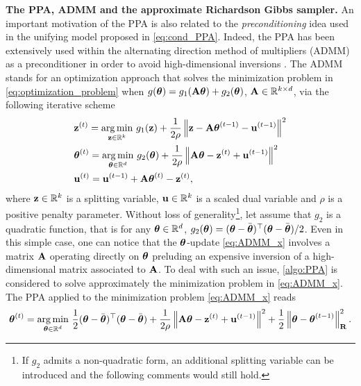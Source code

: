 \documentclass[nohypdvips,onefignum,onetabnum]{siamart171218}
\begin{document}
\noindent\textbf{The PPA, ADMM and the approximate Richardson Gibbs sampler.} An important motivation of the PPA is also related to the {\em preconditioning} idea used in the unifying model proposed in \cref{eq:cond_PPA}.
Indeed, the PPA has been extensively used within the alternating direction method of multipliers (ADMM) \cite{Glowinski1975,Gabay1976,Boyd2011} as a preconditioner in order to avoid high-dimensional inversions \cite{Esser2010,Zhang2011,Chambolle2011,Li2016,Bredies2017}.
The ADMM \cite{Boyd2011} stands for an optimization approach that solves the minimization problem in \cref{eq:optimization_problem} when $g(\boldsymbol{\theta}) = g_1(\mathbf{A}\boldsymbol{\theta}) + g_2(\boldsymbol{\theta})$, $\mathbf{A} \in \mathbb{R}^{k \times d}$, via the following iterative scheme
\begin{align}
  &\B{z}^{(t)} = \underset{\B{z}\in\mathbb{R}^k}{\arg \min}\ g_1(\B{z}) + \dfrac{1}{2\rho}\nr{\B{z} - \B{A}\Bs{\theta}^{(t-1)} - \B{u}^{(t-1)}}^2 \\
  &\Bs{\theta}^{(t)} = \underset{\Bs{\theta}\in\mathbb{R}^d}{\arg \min}\ g_2(\Bs{\theta}) + \dfrac{1}{2\rho}\nr{\B{A}\Bs{\theta} - \B{z}^{(t)} + \B{u}^{(t-1)}}^2 \label{eq:ADMM_x} \\
  &\B{u}^{(t)} = \B{u}^{(t-1)} + \B{A}\Bs{\theta}^{(t)} - \B{z}^{(t)},
\end{align}
where $\mathbf{z} \in \mathbb{R}^k$ is a splitting variable, $\mathbf{u} \in \mathbb{R}^k$ is a scaled dual variable and $\rho$ is a positive penalty parameter.
Without loss of generality\footnote{If $g_2$ admits a non-quadratic form, an additional splitting variable can be introduced and the following comments would still hold.}, let assume that $g_2$ is a quadratic function, that is for any $\boldsymbol{\theta} \in \mathbb{R}^d$, $g_2(\boldsymbol{\theta}) = (\boldsymbol{\theta}-\bar{\boldsymbol{\theta}})^{\top}(\boldsymbol{\theta}-\bar{\boldsymbol{\theta}})/2$.
Even in this simple case, one can notice that the $\boldsymbol{\theta}$-update \cref{eq:ADMM_x} involves a matrix $\mathbf{A}$ operating directly on $\boldsymbol{\theta}$ preluding an expensive inversion of a high-dimensional matrix associated to $\mathbf{A}$.
To deal with such an issue, \cref{algo:PPA} is considered to solve approximately the minimization problem in \cref{eq:ADMM_x}.
The PPA applied to the minimization problem \cref{eq:ADMM_x} reads
\begin{equation}
  \Bs{\theta}^{(t)} = \underset{\Bs{\theta}\in\mathbb{R}^d}{\arg \min}\ \dfrac{1}{2}(\Bs{\theta}-\bar{\Bs{\theta}})^{\top}(\Bs{\theta}-\bar{\Bs{\theta}}) + \dfrac{1}{2\rho}\nr{\B{A}\Bs{\theta} - \B{z}^{(t)} + \B{u}^{(t-1)}}^2 + \dfrac{1}{2}\nr{\Bs{\theta}-\Bs{\theta}^{(t-1)}}^2_{\B{R}} \label{eq:ADMM_x_PPA}.
\end{equation}
\end{document}
